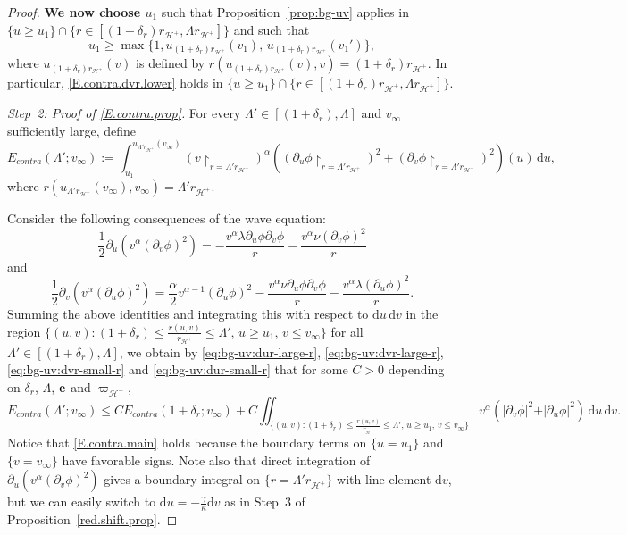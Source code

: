 \documentclass[10pt, reqno]{amsart}
\theoremstyle{definition}
\theoremstyle{remark}
\theoremstyle{conjecture}
\numberwithin{equation}{section}
\newcommand{\abs}[1]{\vert#1\vert}
\newcommand{\set}[1]{\{#1\}}
\newcommand{\ud}{\mathrm{d}}
\newcommand{\rd}{\partial}
\newcommand{\0}{\emptyset}
\newcommand{\alp}{\alpha}
\newcommand{\gmm}{\gamma}
\newcommand{\kpp}{\kappa}
\newcommand{\Lmb}{\Lambda}
\newcommand{\bfe}{{\bf e}}
\newcommand{\calH}{\mathcal H}
\newcommand{\f}{\frac}
\newcommand{\de}{\delta}
\newcommand{\EH}{\calH^{+}}
\newcommand{\pfstep}[1]{\vspace{.5em} {\it \noindent #1.}}
\newcommand{\e}{\bfe}							%
\begin{document}
\begin{proof}
\textbf{We now choose $u_1$} such that Proposition~\ref{prop:bg-uv} applies in $\{u\geq u_1\}\cap\{r\in [(1+{\de_r})r_{\EH},\Lambda r_{\EH}]\}$ and such that
$$u_1\geq \max\{1, u_{(1+{\de_r})r_{\EH}}(v_1),\, u_{(1+{\de_r})r_{\EH}}(v_1')\},$$ 
where $u_{(1+{\de_r})r_{\EH}}(v)$ is defined by $r(u_{(1+{\de_r})r_{\EH}}(v), v)=(1+{\de_r})r_{\EH}$. In particular, \eqref{E.contra.dvr.lower} holds in $\{u\geq u_1\}\cap\{r\in [(1+{\de_r})r_{\EH},\Lambda r_{\EH}]\}$.

\pfstep{Step~2: Proof of \eqref{E.contra.prop}} 
For every $\Lambda'\in [(1+{\de_r}), \Lambda]$ and $v_\infty$ sufficiently large, define
$$E_{contra}(\Lambda'; v_\infty):=\int_{u_1}^{u_{\Lambda' r_{\EH}}(v_\infty)} \left(v\restriction_{r=\Lambda' r_{\EH}}\right)^{\alp}\left((\rd_u\phi\restriction_{r=\Lambda' r_{\EH}})^2+(\rd_v\phi\restriction_{r=\Lambda' r_{\EH}} )^2\right)(u)\, \ud u,$$
where $r(u_{\Lambda' r_{\EH}}(v_\infty), v_{\infty})=\Lambda' r_{\EH}$.

Consider the following consequences of the wave equation:
$$\f 12 \rd_u\left(v^{\alp}\left(\rd_v\phi\right)^2\right)=-\f{v^{\alp}\lambda\rd_u\phi\rd_v\phi}{r}-\f{v^{\alp}\nu(\rd_v\phi)^2}{r}$$
and
$$\f 12 \rd_v\left(v^{\alp}\left(\rd_u\phi\right)^2\right)=\f{\alp}{2}v^{\alp-1}\left(\rd_u\phi\right)^2 -\f{v^{\alp}\nu\rd_u\phi\rd_v\phi}{r}-\f{v^{\alp}\lambda(\rd_u\phi)^2}{r}.$$
Summing the above identities and integrating this with respect to $\ud u\,\ud v$ in the region $\{(u,v): (1+{\de_r})\leq \f{r(u,v)}{r_{\EH}}\leq \Lambda',\, u \geq u_1,\, v\leq v_\infty\}$ for all $\Lambda'\in [(1+{\de_r}),\Lambda]$, we obtain by \eqref{eq:bg-uv:dur-large-r}, \eqref{eq:bg-uv:dvr-large-r}, \eqref{eq:bg-uv:dvr-small-r} and \eqref{eq:bg-uv:dur-small-r} that for some $C>0$ depending on $\de_r$, $\Lambda$, $\e$ and $\varpi_{\EH}$, 
\begin{equation}\label{E.contra.main}
E_{contra}(\Lambda';v_\infty) \leq CE_{contra}(1+\de_r;v_\infty)+C\iint_{\{(u,v): (1+{\de_r})\leq \f{r(u,v)}{r_{\EH}}\leq \Lambda',\, u\geq u_1,\, v\leq v_\infty\}} v^{\alp} (\abs{\rd_{v} \phi}^{2} + \abs{\rd_{u} \phi}^{2}) \, \ud u\, \ud v.
\end{equation}
Notice that \eqref{E.contra.main} holds because the boundary terms on $\{u=u_1\}$ and $\{v=v_\infty\}$ have favorable signs. 
Note also that direct integration of $\rd_{u} \left( v^{\alp} (\rd_{v} \phi)^{2}\right)$ gives a boundary integral on $\set{r = \Lmb' r_{\EH}}$ with line element $\ud v$, but we can easily switch to $\ud u = - \frac{\gmm}{\kpp} \ud v$ as in Step~3 of Proposition~\ref{red.shift.prop}.


\end{proof}
\end{document}
